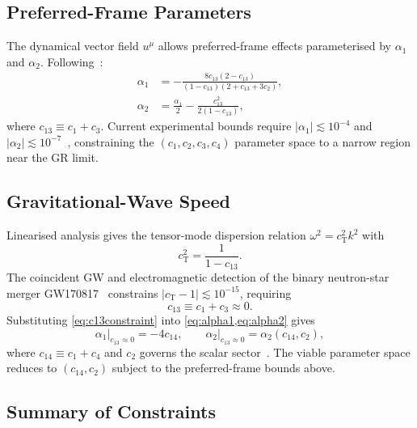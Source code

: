 \documentclass[12pt,a4paper]{article}
\newcommand{\cT}{c_{\mathrm{T}}}
\begin{document}
\subsection{Preferred-Frame Parameters}


The dynamical vector field $u^{\mu}$ allows preferred-frame effects
parameterised by $\alpha_{1}$ and $\alpha_{2}$. Following~\citet{foster2006}:
\begin{align}
  \alpha_{1} &= -\frac{8c_{13}(2-c_{13})}{(1-c_{13})(2+c_{13}+3c_{2})},
  \label{eq:alpha1}\\[4pt]
  \alpha_{2} &= \frac{\alpha_{1}}{2}
               -\frac{c_{13}^{2}}{2(1-c_{13})},
  \label{eq:alpha2}
\end{align}
where $c_{13}\equiv c_{1}+c_{3}$. Current experimental bounds require
$|\alpha_{1}|\lesssim 10^{-4}$ and $|\alpha_{2}|\lesssim
10^{-7}$~\citep{will2014}, constraining the $(c_{1},c_{2},c_{3},c_{4})$
parameter space to a narrow region near the GR limit.

\subsection{Gravitational-Wave Speed}

Linearised analysis gives the tensor-mode dispersion relation
$\omega^{2}=\cT^{2}k^{2}$ with
\begin{equation}
  \cT^{2}=\frac{1}{1-c_{13}}.
  \label{eq:cT}
\end{equation}
The coincident GW and electromagnetic detection of the binary neutron-star
merger GW170817~\citep{abbott2017gw,abbott2017mm} constrains
$|\cT-1|\lesssim 10^{-15}$, requiring
\begin{equation}
  c_{13}\equiv c_{1}+c_{3}\approx 0.
  \label{eq:c13constraint}
\end{equation}
Substituting \cref{eq:c13constraint} into \cref{eq:alpha1,eq:alpha2} gives
\begin{equation}
  \alpha_{1}\big|_{c_{13}\approx 0}=-4c_{14},\qquad
  \alpha_{2}\big|_{c_{13}\approx 0}=\alpha_{2}(c_{14},c_{2}),
\end{equation}
where $c_{14}\equiv c_{1}+c_{4}$ and $c_{2}$ governs the scalar
sector~\citep{foster2006}. The viable parameter space reduces to $(c_{14},
c_{2})$ subject to the preferred-frame bounds above.

\subsection{Summary of Constraints}
\end{document}
